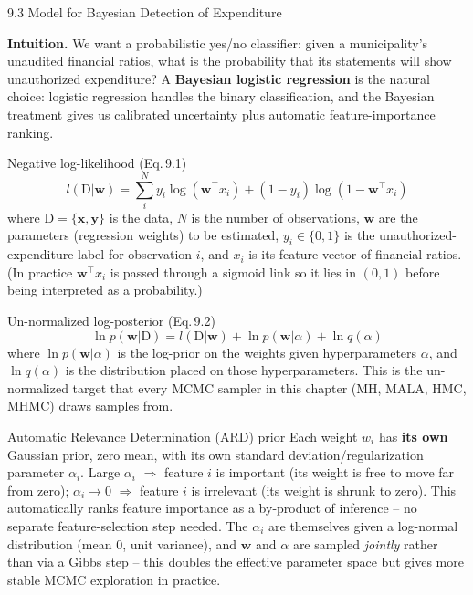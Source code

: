 \documentclass[aspectratio=169,10pt]{beamer}
\newcommand{\vw}{\mathbf{w}}
\newcommand{\vx}{\mathbf{x}}
\begin{document}
\begin{frame}[allowframebreaks]{9.3 Model for Bayesian Detection of Expenditure}

\textbf{Intuition.} We want a probabilistic yes/no classifier: given a
municipality's unaudited financial ratios, what is the probability that its
statements will show unauthorized expenditure? A \textbf{Bayesian logistic
regression} is the natural choice: logistic regression handles the
binary classification, and the Bayesian treatment gives us calibrated
uncertainty plus automatic feature-importance ranking.

\begin{block}{Negative log-likelihood (Eq.\,9.1)}
$$ l(\mathrm D|\vw) = \sum_{i}^{N} y_i \log(\vw^{\!\top} x_i) + (1-y_i)\log(1-\vw^{\!\top} x_i) $$
where $\mathrm D = \{\vx, \mathbf{y}\}$ is the data, $N$ is the number of
observations, $\vw$ are the parameters (regression weights) to be
estimated, $y_i \in \{0,1\}$ is the unauthorized-expenditure label for
observation $i$, and $x_i$ is its feature vector of financial ratios.
(In practice $\vw^{\!\top} x_i$ is passed through a sigmoid link so it lies
in $(0,1)$ before being interpreted as a probability.)
\end{block}

\framebreak

\begin{block}{Un-normalized log-posterior (Eq.\,9.2)}
$$ \ln p(\vw|\mathrm D) = l(\mathrm D|\vw) + \ln p(\vw|\alpha) + \ln q(\alpha) $$
where $\ln p(\vw|\alpha)$ is the log-prior on the weights given
hyperparameters $\alpha$, and $\ln q(\alpha)$ is the distribution placed on
those hyperparameters. This is the un-normalized target that every MCMC
sampler in this chapter (MH, MALA, HMC, MHMC) draws samples from.
\end{block}

\begin{block}{Automatic Relevance Determination (ARD) prior}
Each weight $w_i$ has \textbf{its own} Gaussian prior, zero mean, with its
own standard deviation/regularization parameter $\alpha_i$. Large $\alpha_i$
$\Rightarrow$ feature $i$ is important (its weight is free to move far from
zero); $\alpha_i \to 0$ $\Rightarrow$ feature $i$ is irrelevant (its weight
is shrunk to zero). This automatically ranks feature importance as a
by-product of inference -- no separate feature-selection step needed.
The $\alpha_i$ are themselves given a log-normal distribution (mean 0, unit
variance), and $\vw$ and $\alpha$ are sampled \emph{jointly} rather than via
a Gibbs step -- this doubles the effective parameter space but gives more
stable MCMC exploration in practice.
\end{block}


\end{frame}
\end{document}
